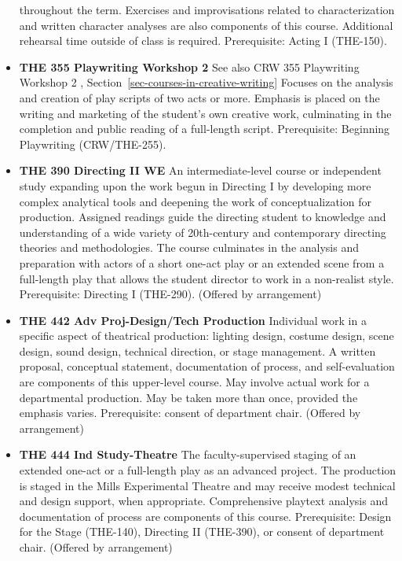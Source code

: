 \documentclass[
  letterpaper,
]{scrbook}
\begin{document}
\begin{itemize}
  throughout the term. Exercises and improvisations related to
  characterization and written character analyses are also components of
  this course. Additional rehearsal time outside of class is required.
  Prerequisite: Acting I (THE-150).
\item
  \textbf{THE 355 Playwriting Workshop 2} See also CRW 355 Playwriting
  Workshop 2 , Section~\ref{sec-courses-in-creative-writing} Focuses on
  the analysis and creation of play scripts of two acts or more.
  Emphasis is placed on the writing and marketing of the student's own
  creative work, culminating in the completion and public reading of a
  full-length script. Prerequisite: Beginning Playwriting
  (CRW/THE-255).\\
\item
  \textbf{THE 390 Directing II WE} An intermediate-level course or
  independent study expanding upon the work begun in Directing I by
  developing more complex analytical tools and deepening the work of
  conceptualization for production. Assigned readings guide the
  directing student to knowledge and understanding of a wide variety of
  20th-century and contemporary directing theories and methodologies.
  The course culminates in the analysis and preparation with actors of a
  short one-act play or an extended scene from a full-length play that
  allows the student director to work in a non-realist style.
  Prerequisite: Directing I (THE-290). (Offered by arrangement)
\item
  \textbf{THE 442 Adv Proj-Design/Tech Production} Individual work in a
  specific aspect of theatrical production: lighting design, costume
  design, scene design, sound design, technical direction, or stage
  management. A written proposal, conceptual statement, documentation of
  process, and self-evaluation are components of this upper-level
  course. May involve actual work for a departmental production. May be
  taken more than once, provided the emphasis varies. Prerequisite:
  consent of department chair. (Offered by arrangement)\\
\item
  \textbf{THE 444 Ind Study-Theatre} The faculty-supervised staging of
  an extended one-act or a full-length play as an advanced project. The
  production is staged in the Mills Experimental Theatre and may receive
  modest technical and design support, when appropriate. Comprehensive
  playtext analysis and documentation of process are components of this
  course. Prerequisite: Design for the Stage (THE-140), Directing II
  (THE-390), or consent of department chair. (Offered by arrangement)

\end{itemize}
\end{document}
